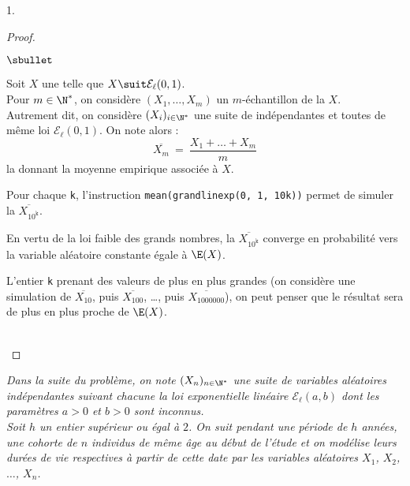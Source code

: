 \documentclass[11pt]{article}%
\begin{document}
\begin{noliste}{1.}
  \begin{proof}~
    \begin{noliste}{$\sbullet$}
    \item Soit $X$ une \var telle que $X \suit \mathcal{E}_\ell(0,
      1)$.\\
      Pour $m \in \N^*$, on considère $(X_1, \ldots, X_m)$ un
      $m$-échantillon de la \var $X$.\\
      Autrement dit, on considère $(X_i)_{i \in \N^*}$ une suite de \var
      indépendantes et toutes de même loi $\mathcal{E}_\ell(0, 1)$. On
      note alors :
      \[
      \overline{X_{m}} \ = \ \dfrac{X_1 + \ldots + X_{m}}{m}
      \]
      la \var donnant la moyenne empirique associée à \var $X$.

    \item Pour chaque {\tt k}, l'instruction {\tt mean(grandlinexp(0,
        1, 10\puis{}k))} permet de simuler la \var
      $\overline{X_{10^{\mathtt{k}}}}$.

    \item En vertu de la loi faible des grands nombres, la \var
      $\overline{X_{10^{\mathtt{k}}}}$ converge en probabilité vers la
      variable aléatoire constante égale à $\E(X)$.

    \item L'entier {\tt k} prenant des valeurs de plus en plus grandes 
      (on
      considère une simulation de $\overline{X_{10}}$, puis
      $\overline{X_{100}}$, \ldots, puis $\overline{X_{1000000}}$), on
      peut penser que le résultat sera de plus en plus proche de
      $\E(X)$.
    \end{noliste}
    ~\\[-1cm]
  \end{proof}
\end{noliste}




\noindent%
{\it Dans la suite du problème, on note $(X_n)_{n\in\N^*}$ une suite
  de variables aléatoires indépendantes suivant chacune la loi
  exponentielle linéaire $\mathcal{E}_\ell(a,b)$ dont les paramètres
  $a>0$ et $b>0$ sont inconnus.\\
  Soit $h$ un entier supérieur ou égal à $2$. On suit pendant une
  période de $h$ années, une \og cohorte \fg{} de $n$ individus de
  même âge au début de l'étude et on modélise leurs durées de vie
  respectives à partir de cette date par les variables aléatoires
  $X_1$, $X_2$, $\hdots$, $X_n$.}
\end{document}
